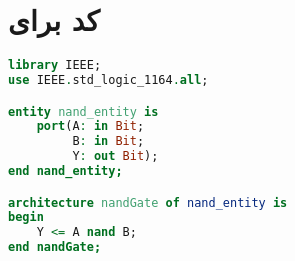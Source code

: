 
\section{کد  برای }

\begin{LTR}
  \begin{lstlisting}[language=vhdl, caption={توصیف \lr{nand}}]
library IEEE;
use IEEE.std_logic_1164.all;

entity nand_entity is
    port(A: in Bit;      
         B: in Bit;     
         Y: out Bit); 
end nand_entity;

architecture nandGate of nand_entity is
begin
    Y <= A nand B;
end nandGate;\end{lstlisting}
\end{LTR}

